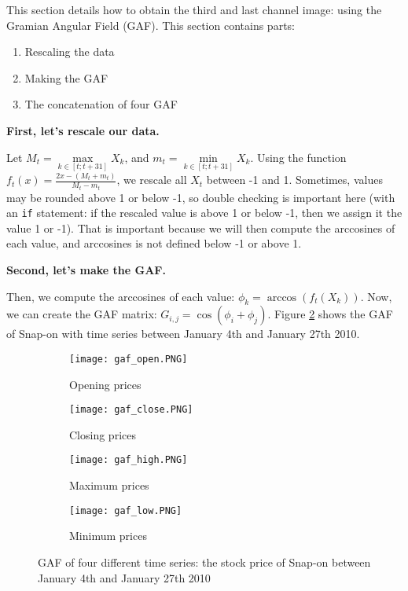 \documentclass[11pt]{article}
\newcommand{\code}[1]{\colorbox{light-gray}{\texttt{#1}}}
\begin{document}
\begin{onehalfspace}
This section details how to obtain the third and last channel image: using the Gramian Angular Field (GAF). This section contains parts:

\begin{enumerate}
    \item Rescaling the data
    \item Making the GAF
    \item The concatenation of four GAF
\end{enumerate}

\noindent \textbf{First, let's rescale our data.}

Let $M_t = \max\limits_{k \in [t;t+31]} X_k$, and $m_t = \min\limits_{k \in [t;t+31]} X_k$. Using the function $f_t(x) = \frac{2 x - (M_t + m_t)}{M_t - m_t}$, we rescale all $X_t$ between -1 and 1. Sometimes, values may be rounded above 1 or below -1, so double checking is important here (with an \code{if} statement: if the rescaled value is above 1 or below -1, then we assign it the value 1 or -1). That is important because we will then compute the arccosines of each value, and arccosines is not defined below -1 or above 1.

\noindent \textbf{Second, let's make the GAF.}

Then, we compute the arccosines of each value: $\phi_k = \arccos(f_t(X_k))$. Now, we can create the GAF matrix: $G_{i,j} = \cos(\phi_i + \phi_j)$. Figure \ref{fig:gaf4} shows the GAF of Snap-on with time series between January 4th and January 27th 2010.

\begin{figure}[h!]
    \centering
    \captionsetup{justification=centering}
    \begin{subfigure}{0.24\textwidth}
        \texttt{[image: gaf\_open.PNG]}
        \caption{Opening prices}
        \label{fig:open_concat}
    \end{subfigure}
    \begin{subfigure}{0.24\textwidth}
        \texttt{[image: gaf\_close.PNG]}
        \caption{Closing prices}
    \end{subfigure}
    \begin{subfigure}{0.24\textwidth}
        \texttt{[image: gaf\_high.PNG]}
        \caption{Maximum prices}
    \end{subfigure}    
    \begin{subfigure}{0.24\textwidth}
        \texttt{[image: gaf\_low.PNG]}
        \caption{Minimum prices}
    \end{subfigure}
    \caption{GAF of four different time series: the stock price of Snap-on between January 4th and January 27th 2010}
    \label{fig:gaf4}
\end{figure}


\end{onehalfspace}
\end{document}
